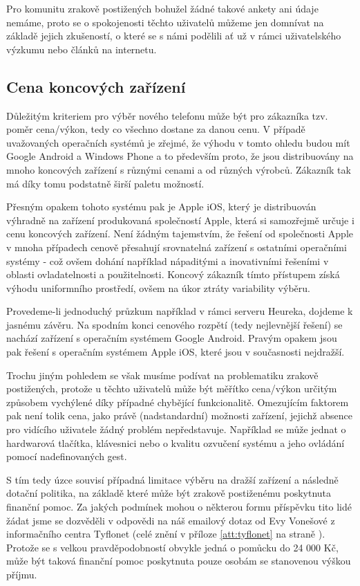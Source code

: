 \documentclass[thesis=M,czech]{FITthesis}[2012/06/26]
\begin{document}
Pro komunitu zrakově postižených bohužel žádné takové ankety ani údaje nemáme, proto se o spokojenosti těchto uživatelů můžeme jen domnívat na základě jejich zkušeností, o které se s námi podělili ať už v rámci uživatelského výzkumu nebo článků na internetu.

\subsection{Cena koncových zařízení}
Důležitým kriteriem pro výběr nového telefonu může být pro zákazníka tzv. poměr cena/výkon, tedy co všechno dostane za danou cenu. V případě uvažovaných operačních systémů je zřejmé, že výhodu v tomto ohledu budou mít Google Android a Windows Phone a to především proto, že jsou distribuovány na mnoho koncových zařízení s různými cenami a od různých výrobců. Zákazník tak má díky tomu podstatně širší paletu možností.

Přesným opakem tohoto systému pak je Apple iOS, který je distribuován výhradně na zařízení produkovaná společností Apple, která si samozřejmě určuje i cenu koncových zařízení. Není žádným tajemstvím, že řešení od společnosti Apple v mnoha případech cenově přesahují srovnatelná zařízení s ostatními operačními systémy - což ovšem dohání například nápaditými a inovativními řešeními v oblasti ovladatelnosti a použitelnosti. Koncový zákazník tímto přístupem získá výhodu uniformního prostředí, ovšem na úkor ztráty variability výběru.

Provedeme-li jednoduchý průzkum například v rámci serveru Heureka\cite{heureka}, dojdeme k jasnému závěru. Na spodním konci cenového rozpětí (tedy nejlevnější řešení) se nachází zařízení s operačním systémem Google Android. Pravým opakem jsou pak řešení s operačním systémem Apple iOS, které jsou v současnosti nejdražší.

Trochu jiným pohledem se však musíme podívat na problematiku zrakově postižených, protože u těchto uživatelů může být měřítko cena/výkon určitým způsobem vychýlené díky případné chybějící funkcionalitě. Omezujícím faktorem pak není tolik cena, jako právě (nadstandardní) možnosti zařízení, jejichž absence pro vidícího uživatele žádný problém nepředstavuje. Například se může jednat o hardwarová tlačítka, klávesnici nebo o kvalitu ozvučení systému a jeho ovládání pomocí nadefinovaných gest.

S tím tedy úzce souvisí případná limitace výběru na dražší zařízení a následně dotační politika, na základě které může být zrakově postiženému poskytnuta finanční pomoc. Za jakých podmínek mohou o některou formu příspěvku tito lidé žádat jsme se dozvěděli v odpovědi na náš emailový dotaz od Evy Vonešové z informačního centra Tyflonet (celé znění v příloze \ref{att:tyflonet} na straně \pageref{att:tyflonet}). Protože se s velkou pravděpodobností obvykle jedná o pomůcku do 24 000 Kč, může být taková finanční pomoc poskytnuta pouze osobám se stanovenou výškou příjmu.
\end{document}
